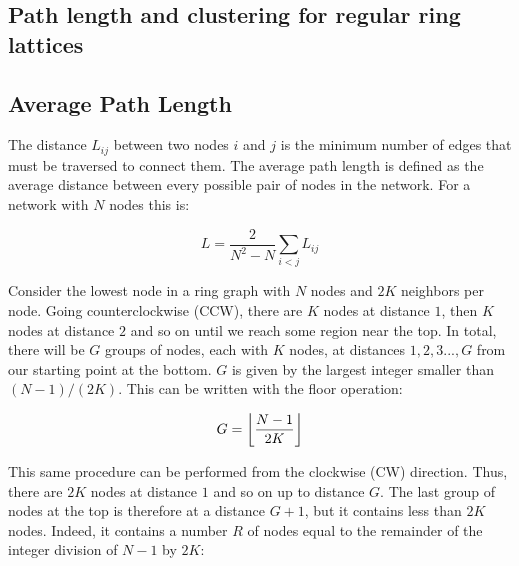 %
%


\begin{apendicesenv}

\partapendices

\chapter{\label{appendix:LC}Path length and clustering for regular ring lattices}

\section{Average Path Length}

The distance $L_{ij}$ between two nodes $i$ and $j$ is the minimum number of edges that must be traversed to connect them. The average
path length is defined as the average distance between every possible pair of nodes in the network. For a network with $N$ nodes this
is:

\begin{equation}
    L = \frac{2}{N^2-N}\sum_{i<j}L_{ij}
\end{equation}

Consider the lowest node in a ring graph with $N$ nodes and $2K$ neighbors per node. Going counterclockwise (CCW), there are $K$ nodes
at distance $1$, then $K$ nodes at distance $2$ and so on until we reach some region near the top. In total, there will be $G$ groups
of nodes, each with $K$ nodes, at distances $1,2,3...,G$ from our starting point at the bottom. $G$ is given by the largest integer
smaller than $(N-1)/(2K)$. This can be written with the floor operation:

\begin{equation}
    G=\floor*{\frac{N-1}{2K}}
\end{equation}

This same procedure can be performed from the clockwise (CW) direction. Thus, there are $2K$ nodes at distance $1$ and so on up to
distance $G$. The last group of nodes at the top is therefore at a distance $G+1$, but it contains less than $2K$ nodes. Indeed, it
contains a number $R$ of nodes equal to the remainder of the integer division of $N-1$ by $2K$:


\end{apendicesenv}
